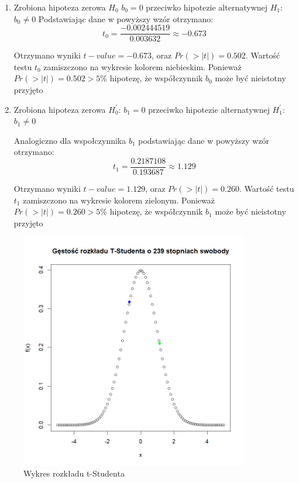 \documentclass[a4paper,11pt]{article}
\begin{document}
\begin{enumerate}
  \item Zrobiona hipoteza zerowa $H_{0}$\: $b_{0}=0$ przeciwko hipotezie alternatywnej $H_{1}$: $b_{0} \ne 0$
  Podstawiając dane w powyższy wzór otrzymano: \[ t_0 = \frac{-0.002444519}{0.003632} \approx -0.673\]  

  Otrzymano wyniki $t-value = -0.673$, oraz $Pr(>|t|) = 0.502$. Wartość testu $t_0$ zamiszczono na wykresie kolorem niebieskim. Ponieważ $Pr(>|t|) = 0.502 > 5\%$ hipotezę, że współczynnik $b_{0}$ może być nieistotny przyjęto

  
  
  \item  Zrobiona hipoteza zerowa $H_{0}^{\prime}$: $b_{1}=0$ przeciwko hipotezie alternatywnej $H_{1}^{\prime}$: $b_{1} \ne 0$

  Analogiczno dla wspołczynnika $b_{1}$ podstawiając dane w powyższy wzór otrzymano: \[ t_1 = \frac{0.2187108}{0.193687} \approx 1.129\]  

  Otrzymano wyniki $t-value = 1.129$, oraz $Pr(>|t|) = 0.260$. Wartość testu $t_1$ zamiszczono na wykresie kolorem zielonym. Ponieważ $Pr(>|t|) = 0.260 > 5\%$ hipotezę, że współczynnik $b_{1}$ może być nieistotny przyjęto

\end{enumerate}


\begin{figure}[!htb]
	\centering
	\includegraphics[width=10cm]{images/tStudent.png}
	\caption{Wykres rozkładu t-Studenta}
         \label{fig:tStudent}
\end{figure}
\end{document}
